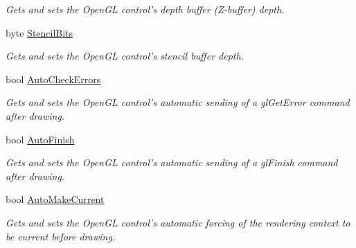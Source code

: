 \begin{DoxyCompactItemize}
\begin{DoxyCompactList}\small\item\em Gets and sets the OpenGL control's depth buffer (Z-\/buffer) depth. \item\end{DoxyCompactList}\item 
byte \hyperlink{class_tao_1_1_platform_1_1_windows_1_1_simple_open_gl_control_ab32f982b8369151f1d22cfaae715cb85}{StencilBits}
\begin{DoxyCompactList}\small\item\em Gets and sets the OpenGL control's stencil buffer depth. \item\end{DoxyCompactList}\item 
bool \hyperlink{class_tao_1_1_platform_1_1_windows_1_1_simple_open_gl_control_a03ee849116a2573afdb23a04f4aa66b6}{AutoCheckErrors}
\begin{DoxyCompactList}\small\item\em Gets and sets the OpenGL control's automatic sending of a glGetError command after drawing. \item\end{DoxyCompactList}\item 
bool \hyperlink{class_tao_1_1_platform_1_1_windows_1_1_simple_open_gl_control_a4a9da59cd62cf5979c3fc6a6a34abd4d}{AutoFinish}
\begin{DoxyCompactList}\small\item\em Gets and sets the OpenGL control's automatic sending of a glFinish command after drawing. \item\end{DoxyCompactList}\item 
bool \hyperlink{class_tao_1_1_platform_1_1_windows_1_1_simple_open_gl_control_a5ed9c1ce7f01443349cf3ca0863ada9f}{AutoMakeCurrent}
\begin{DoxyCompactList}\small\item\em Gets and sets the OpenGL control's automatic forcing of the rendering context to be current before drawing. \item\end{DoxyCompactList}\item 

\end{DoxyCompactItemize}
